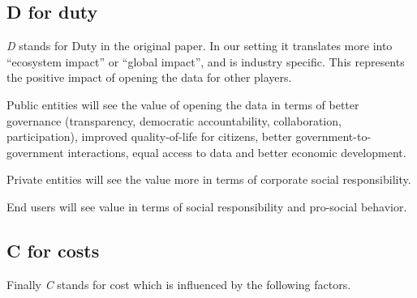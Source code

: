 \documentclass[]{acm_proc_article-sp}
\begin{document}
\subsection{D for duty}\label{d-for-duty}

\emph{D} stands for Duty in the original paper. In our setting it
translates more into ``ecosystem impact'' or ``global impact'', and is
industry specific. This represents the positive impact of opening the
data for other players.

Public entities will see the value of opening the data in terms of
better governance (transparency, democratic accountability,
collaboration, participation), improved quality-of-life for citizens,
better government-to-government interactions, equal access to data and
better economic development.

Private entities will see the value more in terms of corporate social
responsibility.

End users will see value in terms of social responsibility and
pro-social behavior.

\subsection{C for costs}\label{c-for-costs}

Finally \emph{C} stands for cost which is influenced by the following
factors. \vspace{0mm}
\end{document}
